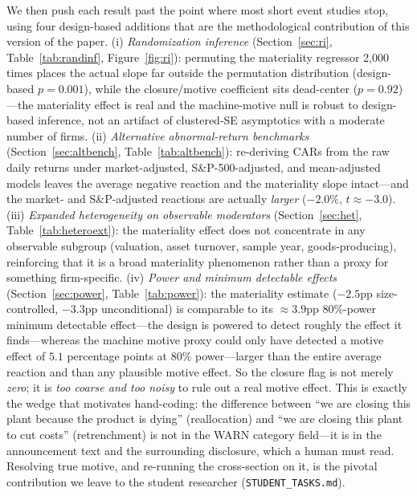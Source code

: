 \documentclass[12pt]{article}
\begin{document}
We then push each result past the point where most short event studies stop, using
four design-based additions that are the methodological contribution of this
version of the paper. (i) \emph{Randomization inference} (Section~\ref{sec:ri},
Table~\ref{tab:randinf}, Figure~\ref{fig:ri}): permuting the materiality regressor
2{,}000 times places the actual slope far outside the permutation distribution
(design-based $p=0.001$), while the closure/motive coefficient sits dead-center
($p=0.92$)---the materiality effect is real and the machine-motive null is robust
to design-based inference, not an artifact of clustered-SE asymptotics with a
moderate number of firms. (ii) \emph{Alternative abnormal-return benchmarks}
(Section~\ref{sec:altbench}, Table~\ref{tab:altbench}): re-deriving CARs from the
raw daily returns under market-adjusted, S\&P-500-adjusted, and mean-adjusted
models leaves the average negative reaction and the materiality slope intact---and
the market- and S\&P-adjusted reactions are actually \emph{larger} ($-2.0\%$,
$t\approx-3.0$). (iii) \emph{Expanded heterogeneity on observable moderators}
(Section~\ref{sec:het}, Table~\ref{tab:heteroext}): the materiality effect does
not concentrate in any observable subgroup (valuation, asset turnover, sample year,
goods-producing), reinforcing that it is a broad materiality phenomenon rather than
a proxy for something firm-specific. (iv) \emph{Power and minimum detectable
effects} (Section~\ref{sec:power}, Table~\ref{tab:power}): the materiality estimate
($-2.5$pp size-controlled, $-3.3$pp unconditional) is comparable to its
$\approx3.9$pp 80\%-power minimum detectable effect---the design is powered to
detect roughly the effect it finds---whereas the machine motive proxy could only
have detected a motive effect of $5.1$ percentage points at 80\% power---larger
than the entire average reaction and than any plausible motive effect. So the
closure flag is not merely \emph{zero}; it is \emph{too coarse and too noisy} to
rule out a real motive effect. This is exactly the wedge that motivates
hand-coding: the difference between ``we are closing this plant because the product
is dying'' (reallocation) and ``we are closing this plant to cut costs''
(retrenchment) is not in the WARN category field---it is in the announcement text
and the surrounding disclosure, which a human must read. Resolving true motive, and
re-running the cross-section on it, is the pivotal contribution we leave to the
student researcher (\texttt{STUDENT\_TASKS.md}).
\end{document}
